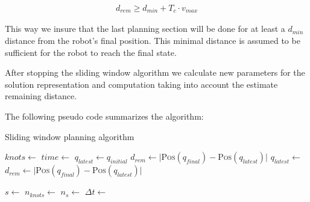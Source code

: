 \documentclass[eprint]{actapoly}
\begin{document}
\begin{align}
  d_{rem} \geq d_{min} + T_c \cdot v_{max}
\end{align}

This way we insure that the last planning section will be done for at least a 
$d_{min}$ distance from the robot's final position.
This minimal distance is assumed to be sufficient for the robot to reach the 
final state.

After stopping the sliding window algorithm we calculate new parameters for the 
solution representation and computation taking into
account the estimate remaining distance.

The following pseudo code summarizes the algorithm: 

\begin{algorithm}
    \caption{Sliding window planning algorithm\label{cod:algo}}
    \label{swpa}
    \begin{algorithmic}[1] %
	    \State $knots \gets $
	    \State $time \gets $
	    \State $q_{latest} \gets q_{initial}$
	    \State $d_{rem} \gets |${\scshape Pos}$(q_{final}) - ${\scshape Pos}$(q_{latest})|$
		\State $q_{latest} \gets $
		\State $d_{rem} \gets |${\scshape Pos}$(q_{final}) - ${\scshape Pos}$(q_{latest})|$
		
	    \EndWhile\label{planningwhile}
	    \State $s \gets $
	    \State $n_{knots} \gets $
	    \State $n_{s} \gets $
	    \State $\Delta t \gets $
	    
        \EndProcedure
    \end{algorithmic}
\end{algorithm}
\end{document}
